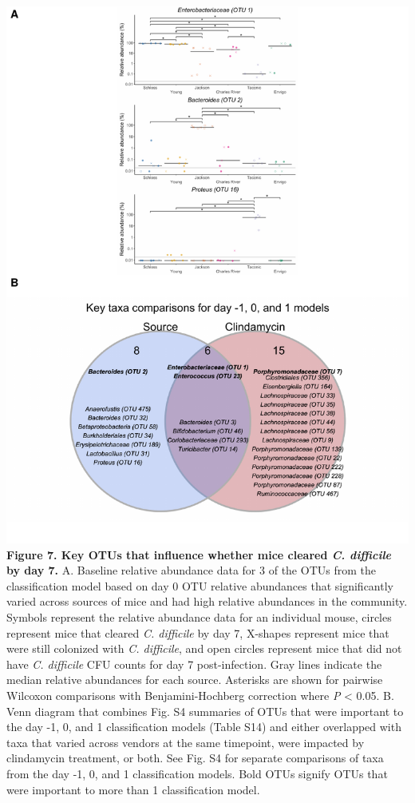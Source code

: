 \documentclass[11pt,]{article}
\begin{document}
\includegraphics{figure_7.pdf} \textbf{Figure 7. Key OTUs that influence
whether mice cleared \emph{C. difficile} by day 7.} A. Baseline relative
abundance data for 3 of the OTUs from the classification model based on
day 0 OTU relative abundances that significantly varied across sources
of mice and had high relative abundances in the community. Symbols
represent the relative abundance data for an individual mouse, circles
represent mice that cleared \emph{C. difficile} by day 7, X-shapes
represent mice that were still colonized with \emph{C. difficile}, and
open circles represent mice that did not have \emph{C. difficile} CFU
counts for day 7 post-infection. Gray lines indicate the median relative
abundances for each source. Asterisks are shown for pairwise Wilcoxon
comparisons with Benjamini-Hochberg correction where \emph{P}
\textless{} 0.05. B. Venn diagram that combines Fig. S4 summaries of
OTUs that were important to the day -1, 0, and 1 classification models
(Table S14) and either overlapped with taxa that varied across vendors
at the same timepoint, were impacted by clindamycin treatment, or both.
See Fig. S4 for separate comparisons of taxa from the day -1, 0, and 1
classification models. Bold OTUs signify OTUs that were important to
more than 1 classification model.
\end{document}
